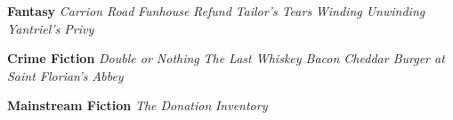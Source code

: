 
\begingroup

\def\genre#1{{\bigskip\bf#1}}
\def\genrebook#1{{\smallskip\it#1}}

\parindent=0pt

\genre{Fantasy}
  \genrebook{Carrion Road}
  \genrebook{Funhouse}
  \genrebook{Refund}
  \genrebook{Tailor's Tears}
  \genrebook{Winding Unwinding}
  \genrebook{Yantriel's Privy}

\genre{Crime Fiction}
  \genrebook{Double or Nothing}
  \genrebook{The Last Whiskey Bacon Cheddar Burger at Saint Florian's Abbey}

\genre{Mainstream Fiction}
  \genrebook{The Donation}
  \genrebook{Inventory}

\endgroup
